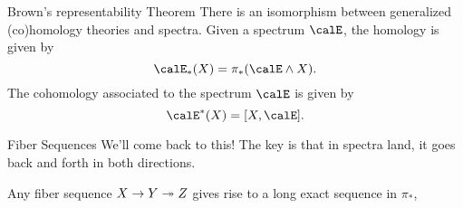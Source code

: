 \begin{theorem}{Brown's representability Theorem}{}
    There is an isomorphism between generalized (co)homology theories and spectra. Given a spectrum $\calE$, the homology is given by $$\calE_\ast(X) = \pi_\ast(\calE\wedge X).$$ The cohomology associated to the spectrum $\calE$ is given by $$\calE^\ast(X) = [X,\calE].$$
\end{theorem}

\begin{definition}{Fiber Sequences}{}
    We'll come back to this! The key is that in spectra land, it goes back and forth in both directions. 
\end{definition}

\begin{fact}{}{}
    Any fiber sequence $X\to Y\twoheadrightarrow Z$ gives rise to a long exact sequence in $\pi_\ast$, %
    \begin{center}
    \end{center}
\end{fact}